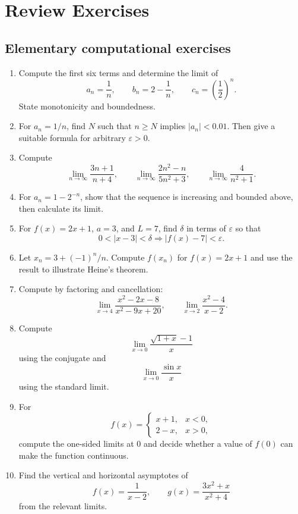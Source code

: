 \section{Review Exercises}

\subsection{Elementary computational exercises}

\begin{enumerate}
\item Compute the first six terms and determine the limit of
\[
a_n=\frac1n,
\qquad b_n=2-\frac1n,
\qquad c_n=\left(\frac12\right)^n.
\]
State monotonicity and boundedness.

\item For $a_n=1/n$, find $N$ such that $n\ge N$ implies $|a_n|<0.01$. Then give a suitable formula for arbitrary $\varepsilon>0$.

\item Compute
\[
\lim_{n\to\infty}\frac{3n+1}{n+4},
\qquad
\lim_{n\to\infty}\frac{2n^2-n}{5n^2+3},
\qquad
\lim_{n\to\infty}\frac4{n^2+1}.
\]

\item For $a_n=1-2^{-n}$, show that the sequence is increasing and bounded above, then calculate its limit.

\item For $f(x)=2x+1$, $a=3$, and $L=7$, find $\delta$ in terms of $\varepsilon$ so that
\[
0<|x-3|<\delta\Longrightarrow |f(x)-7|<\varepsilon.
\]

\item Let $x_n=3+(-1)^n/n$. Compute $f(x_n)$ for $f(x)=2x+1$ and use the result to illustrate Heine's theorem.

\item Compute by factoring and cancellation:
\[
\lim_{x\to4}\frac{x^2-2x-8}{x^2-9x+20},
\qquad
\lim_{x\to2}\frac{x^2-4}{x-2}.
\]

\item Compute
\[
\lim_{x\to0}\frac{\sqrt{1+x}-1}{x}
\]
using the conjugate and
\[
\lim_{x\to0}\frac{\sin x}{x}
\]
using the standard limit.

\item For
\[
f(x)=\begin{cases}
x+1,&x<0,\\
2-x,&x>0,
\end{cases}
\]
compute the one-sided limits at $0$ and decide whether a value of $f(0)$ can make the function continuous.

\item Find the vertical and horizontal asymptotes of
\[
f(x)=\frac1{x-2},
\qquad
g(x)=\frac{3x^2+x}{x^2+4}
\]
from the relevant limits.
\end{enumerate}

